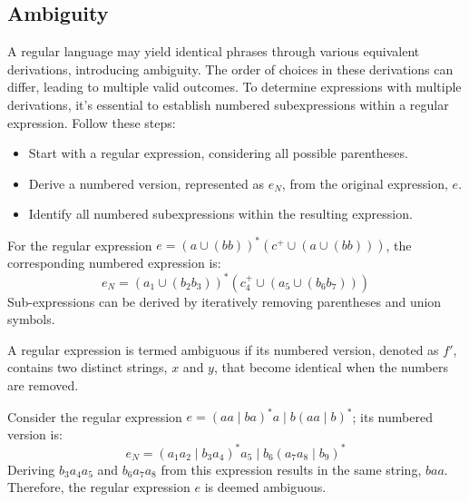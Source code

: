 \subsection{Ambiguity}
A regular language may yield identical phrases through various equivalent derivations, introducing ambiguity.
The order of choices in these derivations can differ, leading to multiple valid outcomes.
To determine expressions with multiple derivations, it's essential to establish numbered subexpressions within a regular expression. 
Follow these steps:
\begin{itemize}
    \item Start with a regular expression, considering all possible parentheses.
    \item Derive a numbered version, represented as $e_N$, from the original expression, $e$.
    \item Identify all numbered subexpressions within the resulting expression.
\end{itemize}
\begin{example}
    For the regular expression $e=(a \cup(bb))^{\ast}(c^{+} \cup(a\cup(bb)))$, the corresponding numbered expression is:
    \[e_N=(a_1\cup(b_2b_3))^{\ast}(c_4^{+} \cup(a_5\cup(b_6b_7)))\]
    Sub-expressions can be derived by iteratively removing parentheses and union symbols.
\end{example}
\begin{definition}
    A regular expression is termed ambiguous if its numbered version, denoted as $f'$, contains two distinct strings, $x$ and $y$, that become identical when the numbers are removed.
\end{definition}
\begin{example}
    Consider the regular expression $e=(aa\mid ba)^{\ast}a\mid b(aa\mid b)^{\ast}$; its numbered version is:
    \[e_N=(a_1a_2\mid b_3a_4)^{\ast}a_5\mid b_6(a_7a_8\mid b_9)^{\ast}\]
    Deriving $b_3a_4a_5$ and $b_6a_7a_8$ from this expression results in the same string, $baa$. 
    Therefore, the regular expression $e$ is deemed ambiguous.
\end{example}

